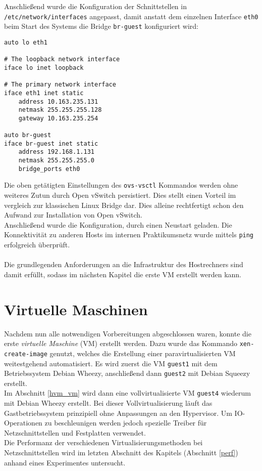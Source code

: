 Anschließend wurde die Konfiguration der Schnittstellen in \verb#/etc/network/interfaces# angepasst, damit anstatt dem einzelnen Interface \verb#eth0# beim Start des Systems die Bridge \verb#br-guest# konfiguriert wird:
\setupVerbatimOut
\begin{verbatim}
auto lo eth1

# The loopback network interface
iface lo inet loopback

# The primary network interface
iface eth1 inet static
    address 10.163.235.131
    netmask 255.255.255.128
    gateway 10.163.235.254

auto br-guest
iface br-guest inet static
    address 192.168.1.131
    netmask 255.255.255.0
    bridge_ports eth0
\end{verbatim}

Die oben getätigten Einstellungen des \verb#ovs-vsctl# Kommandos werden ohne weiteres Zutun durch Open vSwitch persistiert. Dies stellt einen Vorteil im vergleich zur klassischen Linux Bridge dar. Dies alleine rechtfertigt schon den Aufwand zur Installation von Open vSwitch. 
\\
Anschließend wurde die Konfiguration, durch einen Neustart geladen. Die Konnektivität zu anderen Hosts im internen Praktikumsnetz wurde mittels \verb#ping# erfolgreich überprüft.
\\
\\
Die grundlegenden Anforderungen an die Infrastruktur des Hostrechners sind damit erfüllt, sodass im nächsten Kapitel die erste VM erstellt werden kann.

\chapter{Virtuelle Maschinen}\label{vms}
Nachdem nun alle notwendigen Vorbereitungen abgeschlossen waren, konnte die erste \emph{virtuelle Maschine} (VM) erstellt werden. Dazu wurde das Kommando \verb#xen-create-image# genutzt, welches die Erstellung einer paravirtualisierten VM weitestgehend automatisiert. Es wird zuerst die VM \verb#guest1# mit dem Betriebssystem Debian Wheezy, anschließend dann \verb#guest2# mit Debian Squeezy erstellt.
\\
Im Abschnitt \ref{hvm_vm} wird dann eine vollvirtualisierte VM \verb#guest4# wiederum mit Debian Wheezy erstellt. Bei dieser Vollvirtualisierung läuft das Gastbetriebssystem prinzipiell ohne Anpassungen an den Hypervisor. Um IO-Operationen zu beschleunigen werden jedoch spezielle Treiber für Netzschnittstellen und Festplatten verwendet. 
\\
Die Performanz der verschiedenen Virtualisierungsmethoden bei Netzschnittstellen wird im letzten Abschnitt des Kapitels (Abschnitt \ref{perf}) anhand eines Experimentes untersucht.

